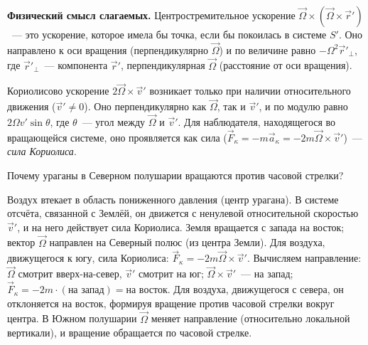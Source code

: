 \documentclass[../main.tex]{subfiles}
\begin{document}
\noindent\textbf{Физический смысл слагаемых.}
Центростремительное ускорение $\vec{\Omega}\times(\vec{\Omega}\times\vec{r}')$~---
это ускорение, которое имела бы точка, если бы покоилась в системе $S'$.
Оно направлено к оси вращения (перпендикулярно $\vec{\Omega}$)
и по величине равно $-\Omega^2 \vec{r}'_\perp$, где $\vec{r}'_\perp$~---
компонента $\vec{r}'$, перпендикулярная $\vec{\Omega}$
(расстояние от оси вращения).

Кориолисово ускорение $2\vec{\Omega}\times\vec{v}'$ возникает только
при наличии относительного движения ($\vec{v}' \ne 0$).
Оно перпендикулярно как $\vec{\Omega}$, так и $\vec{v}'$,
и по модулю равно $2\Omega v'\sin\theta$, где $\theta$~---
угол между $\vec{\Omega}$ и $\vec{v}'$.
Для наблюдателя, находящегося во вращающейся системе,
оно проявляется как сила ($\vec{F}_\kappa = -m\vec{a}_\kappa = -2m\vec{\Omega}\times\vec{v}'$)~---
\textit{сила Кориолиса}.

\begin{example}
Почему ураганы в Северном полушарии вращаются против часовой стрелки?

Воздух втекает в область пониженного давления (центр урагана).
В системе отсчёта, связанной с Землёй, он движется с ненулевой
относительной скоростью $\vec{v}'$, и на него действует сила Кориолиса.
Земля вращается с запада на восток; вектор $\vec{\Omega}$
направлен на Северный полюс (из центра Земли).
Для воздуха, движущегося к югу, сила Кориолиса:
$\vec{F}_\kappa = -2m\vec{\Omega}\times\vec{v}'$.
Вычисляем направление: $\vec{\Omega}$ смотрит вверх-на-север,
$\vec{v}'$ смотрит на юг; $\vec{\Omega}\times\vec{v}'$~--- на запад;
$\vec{F}_\kappa = -2m\cdot(\text{на запад}) = \text{на восток}$.
Для воздуха, движущегося с севера, он отклоняется на восток,
формируя вращение против часовой стрелки вокруг центра.
В Южном полушарии $\vec{\Omega}$ меняет направление (относительно
локальной вертикали), и вращение обращается по часовой стрелке.
\end{example}
\end{document}
